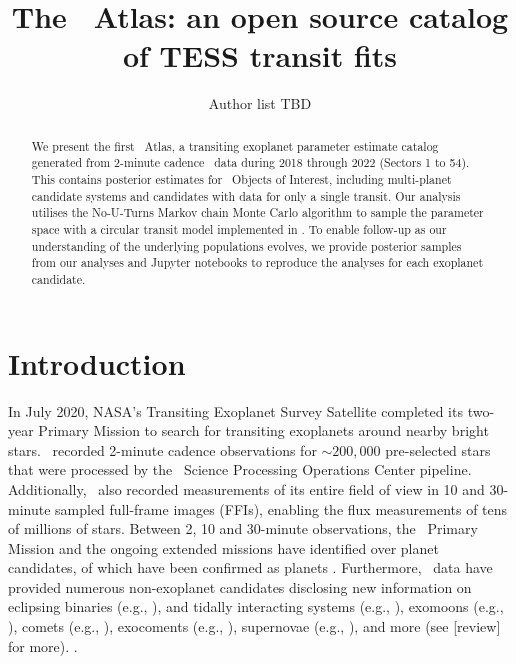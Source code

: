 \documentclass[linenumbers,floatfix,ApJL,twocolumn]{aastex631}
\begin{document}
\title{The \tess\ Atlas: an open source catalog of TESS transit fits}


\author{Author list TBD}
% 





\begin{abstract}
We present the first \tess\ Atlas, a transiting exoplanet parameter estimate catalog generated from 2-minute cadence \tess\ data during 2018 through 2022 (Sectors 1 to 54).
This contains posterior estimates for \red{\numAnalysed} \tess\ Objects of Interest, including \red{\numAnalysedMulti} multi-planet candidate systems and \red{\numAnalysedSingle} candidates with data for only a single transit. 
Our analysis utilises the No-U-Turns Markov chain Monte Carlo algorithm to sample the parameter space with a circular transit model implemented in \exoplanet. 
To enable follow-up as our understanding of the underlying populations evolves, we provide posterior samples from our analyses and Jupyter notebooks to reproduce the analyses for each exoplanet candidate.
\end{abstract}




\section{Introduction} \label{sec:intro}

In July 2020, NASA’s Transiting Exoplanet Survey Satellite \citep{Ricker:2015:JATIS} completed its two-year Primary Mission to search for transiting exoplanets around nearby bright stars. 
\tess\ recorded 2-minute cadence observations for $\sim200,000$ pre-selected stars that were processed by the \tess\ Science Processing Operations Center \citep{Jenkins:2016:SPIE} pipeline. 
Additionally, \tess\ also recorded measurements of its entire field of view in 10 and 30-minute sampled full-frame images (FFIs), enabling the flux measurements of tens of millions of stars. 
Between 2, 10 and 30-minute observations, the \tess\ Primary Mission and the ongoing extended missions have identified over \red{$\numTessCandidates$} planet candidates, \red{$\numTessPlanets$} of which have been confirmed as planets \citep{Stassun:2018:AJ, Stassun:2019:AJ, Guerrero:2021:ApJS, Guerrero:2021:AAS}. 
Furthermore, \tess\ data have provided numerous non-exoplanet candidates disclosing new information on eclipsing binaries (e.g., ), and tidally interacting systems (e.g., ), exomoons (e.g., ), comets (e.g., ),  exocoments (e.g., ), supernovae (e.g., ), and more (see [review] for more). .
\end{document}
